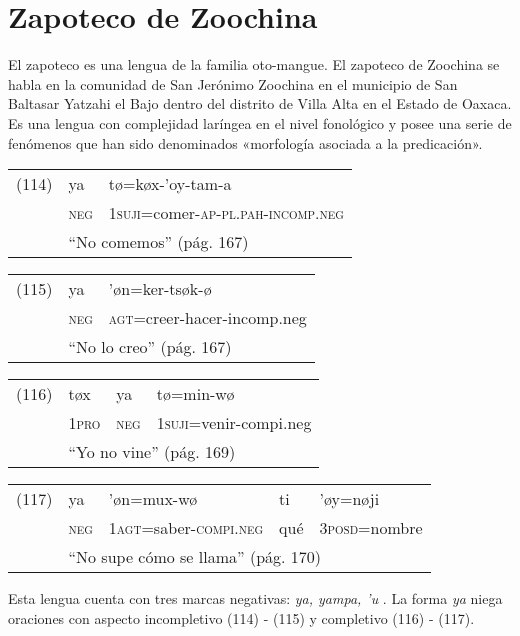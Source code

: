 \section*{Zapoteco de Zoochina}

\noindent El zapoteco es una lengua de la familia oto-mangue. El zapoteco de Zoochina se habla en la comunidad de San Jerónimo Zoochina en el municipio de San Baltasar Yatzahi el Bajo dentro del distrito de Villa Alta en el Estado de Oaxaca. Es una lengua con complejidad laríngea en el nivel fonológico y posee una serie de fenómenos que han sido denominados «morfología asociada a la predicación». \vspace{0.5cm}

{\setmainfont{Charis SIL}

\begin{tabular}{lll}
(114) & ya & tø=køx-’oy-tam-a \\
& \textsc{neg} & \textsc{1suji}=comer-\textsc{ap-pl.pah-incomp.neg} \\
& \multicolumn{2}{l}{``No comemos'' (pág. 167)}
\end{tabular} \vspace{0.5cm}

\begin{tabular}{lll}
(115) & ya & ’øn=ker-tsøk-ø \\
& \textsc{neg} & \textsc{agt}=creer-hacer-incomp.neg \\
& \multicolumn{2}{l}{``No lo creo'' (pág. 167)}
\end{tabular} \vspace{0.5cm}

\begin{tabular}{llll}
(116) & tøx & ya & tø=min-wø \\
& \textsc{1pro} & \textsc{neg} & \textsc{1suji}=venir-compi.neg \\
& \multicolumn{3}{l}{``Yo no vine'' (pág. 169)}
\end{tabular} \vspace{0.5cm}

\begin{tabular}{lllll}
(117) & ya & ’øn=mux-wø & ti & ’øy=nøji \\
& \textsc{neg} & \textsc{1agt}=saber-\textsc{compi.neg} & qué & \textsc{3posd}=nombre \\
& \multicolumn{4}{l}{``No supe cómo se llama'' (pág. 170)}
\end{tabular} \vspace{0.5cm}





}

Esta lengua cuenta con tres marcas negativas: {\setmainfont{Charis SIL} \textit{ya, yampa, 'u}} \textcolor{MidnightBlue}{\citep{zapoteco}}. La forma {\setmainfont{Charis SIL} \textit{ya}} niega oraciones con aspecto incompletivo (114) - (115) y completivo (116) - (117).